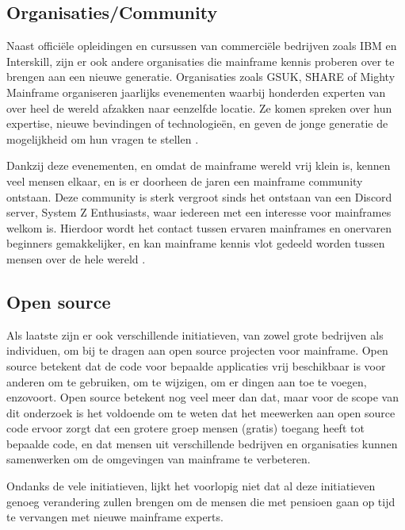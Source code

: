\subsection{Organisaties/Community}
Naast officiële opleidingen en cursussen van commerciële bedrijven zoals IBM en Interskill, zijn er ook andere organisaties die mainframe kennis proberen over te brengen aan een nieuwe generatie. Organisaties zoals GSUK, SHARE of Mighty Mainframe organiseren jaarlijks evenementen waarbij honderden experten van over heel de wereld afzakken naar eenzelfde locatie. Ze komen spreken over hun expertise, nieuwe bevindingen of technologieën, en geven de jonge generatie de mogelijkheid om hun vragen te stellen \autocite{Project2025}.

Dankzij deze evenementen, en omdat de mainframe wereld vrij klein is, kennen veel mensen elkaar, en is er doorheen de jaren een mainframe community ontstaan. Deze community is sterk vergroot sinds het ontstaan van een Discord server, System Z Enthusiasts, waar iedereen met een interesse voor mainframes welkom is. Hierdoor wordt het contact tussen ervaren mainframes en onervaren beginners gemakkelijker, en kan mainframe kennis vlot gedeeld worden tussen mensen over de hele wereld \autocite{Perva2024}.

\subsection{Open source}
Als laatste zijn er ook verschillende initiatieven, van zowel grote bedrijven als individuen, om bij te dragen aan open source projecten voor mainframe. Open source betekent dat de code voor bepaalde applicaties vrij beschikbaar is voor anderen om te gebruiken, om te wijzigen, om er dingen aan toe te voegen, enzovoort. Open source betekent nog veel meer dan dat, maar voor de scope van dit onderzoek is het voldoende om te weten dat het meewerken aan open source code ervoor zorgt dat een grotere groep mensen (gratis) toegang heeft tot bepaalde code, en dat mensen uit verschillende bedrijven en organisaties kunnen samenwerken om de omgevingen van mainframe te verbeteren. \autocite{Perens1999}

Ondanks de vele initiatieven, lijkt het voorlopig niet dat al deze initiatieven genoeg verandering zullen brengen om de mensen die met pensioen gaan op tijd te vervangen met nieuwe mainframe experts.


